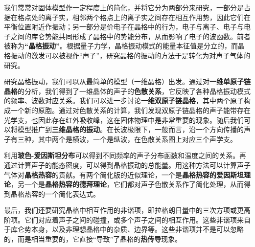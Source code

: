 
我们常常对固体模型作一定程度上的简化，并将它分为两部分来研究，一部分是占据在格点处的离子实，相邻两个格点上的离子实之间存在相互作用势，因此它们在平衡位置附近作振动；另一部分是价电子在晶格中的行为，电子与离子、电子与电子之间的库仑势能共同形成了晶格中的势能分布，从而影响了电子的波函数。前者被称为\textbf{“晶格振动”}。根据量子力学，晶格振动模式的能量本征值是分立的，而晶格振动的激发可以被视作“声子”，研究晶格的振动的方法于是转化为对声子气体的研究。

研究晶格振动，我们可以从最简单的模型（一维晶格）出发。通过对\textbf{一维单原子链晶格}的分析，我们得到了一维晶体的声子的\textbf{色散关系}，它反映了各种晶格振动模式的频率、波数对应关系。我们可以进一步讨论\textbf{一维双原子链晶格}，其中两个原子构成一个新的原胞。通过对色散关系的计算，我们发现双原子链晶格的声子能带存在光学支，也因此存在红外吸收峰，这在固体物理中是非常重要的现象。随后我们可以将模型推广到\textbf{三维晶格的振动}。在长波极限下，一般而言，沿一个方向传播的声子有三种，其中两个是横波，一个是纵波，在色散关系图上对应三个声学支。

利用\textbf{玻色-爱因斯坦分布}可以得到不同频率的声子分布函数和温度之间的关系。再通过计算声子的能态密度，可以得到晶格振动的总能量。用这种方法可以计算声子气体对\textbf{晶格热容}的贡献。有两个简化版的近似理论，一个是\textbf{晶格热容的爱因斯坦理论}，另一个是\textbf{晶格热容的德拜理论}，它们都对声子色散关系作了简化处理，从而得到晶格热容的一个简化表达式。

最后，我们还要研究晶格中相互作用的非谐项，即拉格朗日量中的三次方项或更高阶项。它们对应着声子之间的碰撞，或多个声子之间的相互作用。这些非谐项来自于库仑势本身，以及非理想晶格中的杂质、边界等。这些非谐项并不是可以忽略的，而是相当重要的，它直接“导致”了晶格的\textbf{热传导}现象。
